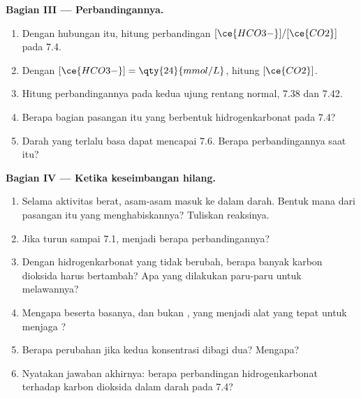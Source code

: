 \begin{problem}
\medskip
\noindent\textbf{Bagian III --- Perbandingannya.}
\begin{enumerate}[resume]
  \item Dengan hubungan itu, hitung perbandingan $[\ce{HCO3-}]/[\ce{CO2}]$
        pada  7.4.
  \item Dengan $[\ce{HCO3-}] = \qty{24}{mmol/L}$, hitung $[\ce{CO2}]$.
  \item Hitung perbandingannya pada kedua ujung rentang normal, 7.38 dan
        7.42.
  \item Berapa bagian pasangan itu yang berbentuk hidrogenkarbonat pada
         7.4?
  \item Darah yang terlalu basa dapat mencapai  7.6. Berapa
        perbandingannya saat itu?
\end{enumerate}

\medskip
\noindent\textbf{Bagian IV --- Ketika keseimbangan hilang.}
\begin{enumerate}[resume]
  \item Selama aktivitas berat, asam-asam masuk ke dalam darah. Bentuk
        mana dari pasangan itu yang menghabiskannya? Tuliskan reaksinya.
  \item Jika  turun sampai 7.1, menjadi berapa perbandingannya?
  \item Dengan hidrogenkarbonat yang tidak berubah, berapa banyak karbon
        dioksida harus bertambah? Apa yang dilakukan paru-paru untuk
        melawannya?
  \item Mengapa  beserta basanya, dan bukan , yang
        menjadi alat yang tepat untuk menjaga ?
  \item Berapa perubahan  jika kedua konsentrasi dibagi dua? Mengapa?
  \item Nyatakan jawaban akhirnya: berapa perbandingan hidrogenkarbonat
        terhadap karbon dioksida dalam darah pada  7.4?
\end{enumerate}
\end{problem}
